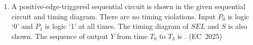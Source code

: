 \begin{enumerate}[label=\thesubsection.\arabic*, ref=\thesubsection.\theenumi]
\item
A positive-edge-triggered sequential circuit is shown in the given sequential circuit and timing diagram. There are no timing violations. Input $P_0$ is logic `0' and $P_1$ is logic `1' at all times. The timing diagram of $SEL$ and $S$ is also shown. The sequence of output $Y$ from time $T_0$ to $T_3$ is \underline{\hspace{1cm}}.
\hfill (EC~2025)
\begin{enumerate}
	\begin{multicols}{4}
    \item 1011
    \item 0100
    \item 0010
    \item 1101
    \end{multicols}
\end{enumerate}


\end{enumerate}
